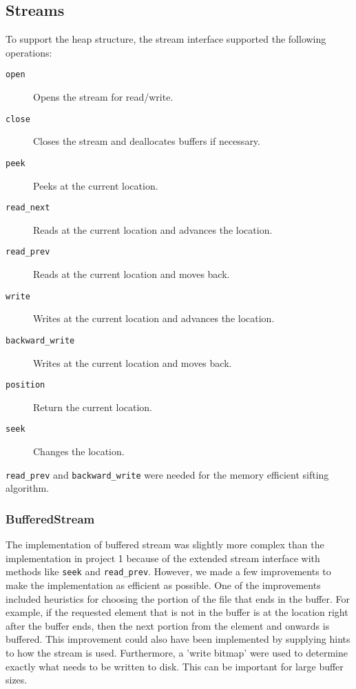 \subsection{Streams}

To support the heap structure, the stream interface supported the following operations:

\begin{description}
\item[{\texttt{open}}] Opens the stream for read/write.
\item[{\texttt{close}}] Closes the stream and deallocates buffers if necessary.
\item[{\texttt{peek}}] Peeks at the current location.
\item[{\texttt{read\_next}}] Reads at the current location and advances the location.
\item[{\texttt{read\_prev}}] Reads at the current location and moves back.
\item[{\texttt{write}}] Writes at the current location and advances the location.
\item[{\texttt{backward\_write}}] Writes at the current location and moves back.
\item[{\texttt{position}}] Return the current location.
\item[{\texttt{seek}}] Changes the location.
\end{description}

\texttt{read\_prev} and \texttt{backward\_write} were needed for the memory efficient sifting algorithm.

\subsubsection{BufferedStream}

The implementation of buffered stream was slightly more complex than the implementation in project 1 because of the extended stream interface with methods like \texttt{seek} and \texttt{read\_prev}. However, we made a few improvements to make the implementation as efficient as possible. One of the improvements included heuristics for choosing the portion of the file that ends in the buffer. For example, if the requested element that is not in the buffer is at the location right after the buffer ends, then the next portion from the element and onwards is buffered. This improvement could also have been implemented by supplying hints to how the stream is used. Furthermore, a 'write bitmap' were used to determine exactly what needs to be written to disk. This can be important for large buffer sizes.

